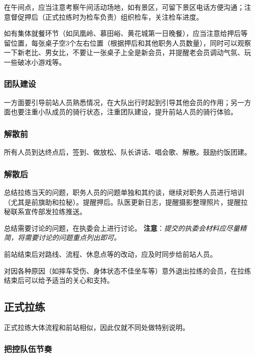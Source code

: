 \documentclass[UTF8]{ctexart}
\begin{document}
在午间点，应当注意考察午间活动场地，如有景区，可留下景区电话方便沟通；注意督促押后（正式拉练时为检车负责）组织检车，关注检车进度。

如有集体就餐环节（如凤凰岭、慕田峪、黄花城第一日晚餐），应当注意给押后等留位置，每张桌子空3个左右位置（根据押后和其他职务人员数量），同时可以观察一下新老比、男女比，不要让一张桌子上全是新会员，并提醒老会员调动气氛、玩一些破冰小游戏等。

\subsubsection{团队建设}

一方面要引导前站人员熟悉情况，在大队出行时起到引导其他会员的作用；另一方面也要注重小队成员的骑行状态，注重团队建设，提升前站人员的骑行体验。

\subsubsection{解散前}

所有人员到达终点后，签到、做放松、队长讲话、唱会歌、解散。鼓励约饭团建。

\subsubsection{解散后}

总结拉练当天的问题，职务人员的问题单独和其约谈，继续对职务人员进行培训（尤其是前旗助和拉秘）。提醒押后。队医更新日志，提醒摄影整理照片，提醒拉秘联系宣传部发拉练推送。

总结需要讨论的问题，在执委会上进行讨论。
\textbf{注意}：\textit{提交的执委会材料应尽量精简，将需要讨论的问题重点列出即可。}

前站结束后对路线、流程、休息点等的改动，应及时同步给前站人员。

对因各种原因（如摔车受伤、身体状态不佳坐车等）意外退出拉练的会员，在拉练结束后可以给予适当的关心和支持。

\subsection{正式拉练}

正式拉练大体流程和前站相似，因此仅就不同处做特别说明。

\subsubsection{把控队伍节奏}
\end{document}
